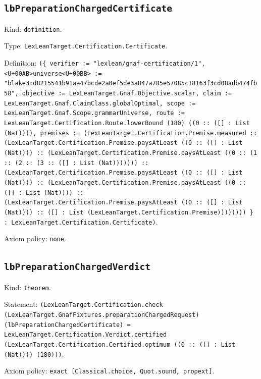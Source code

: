 \documentclass[11pt]{article}
\begin{document}
\subsection*{\texttt{lbPreparationChargedCertificate}}
\noindent Kind: \texttt{definition}.\par
\noindent Type: \texttt{LexLeanTarget.Certification.Certificate}.\par
\noindent Definition: \texttt{(\{ verifier := "lexlean/gnaf-certification/1", <U+00AB>universe<U+00BB> := "blake3:d8215541b91aa47bcde2a0ef5de3a847a785e57085c18163f3cd08adb474fb58", objective := LexLeanTarget.Gnaf.Objective.scalar, claim := LexLeanTarget.Gnaf.ClaimClass.globalOptimal, scope := LexLeanTarget.Gnaf.Scope.grammarUniverse, route := LexLeanTarget.Certification.Route.lowerBound (180) ((0 :: ([] : List (Nat)))), premises := (LexLeanTarget.Certification.Premise.measured :: (LexLeanTarget.Certification.Premise.paysAtLeast ((0 :: ([] : List (Nat)))) :: (LexLeanTarget.Certification.Premise.paysAtLeast ((0 :: (1 :: (2 :: (3 :: ([] : List (Nat))))))) :: (LexLeanTarget.Certification.Premise.paysAtLeast ((0 :: ([] : List (Nat)))) :: (LexLeanTarget.Certification.Premise.paysAtLeast ((0 :: ([] : List (Nat)))) :: (LexLeanTarget.Certification.Premise.paysAtLeast ((0 :: ([] : List (Nat)))) :: ([] : List (LexLeanTarget.Certification.Premise)))))))) \} : LexLeanTarget.Certification.Certificate)}.\par
\noindent Axiom policy: \texttt{none}.\par
\subsection*{\texttt{lbPreparationChargedVerdict}}
\noindent Kind: \texttt{theorem}.\par
\noindent Statement: \texttt{(LexLeanTarget.Certification.check (LexLeanTarget.GnafFixtures.preparationChargedRequest) (lbPreparationChargedCertificate) = LexLeanTarget.Certification.Verdict.certified (LexLeanTarget.Certification.Certified.optimum ((0 :: ([] : List (Nat)))) (180)))}.\par
\noindent Axiom policy: \texttt{exact [Classical.choice, Quot.sound, propext]}.\par
\end{document}
